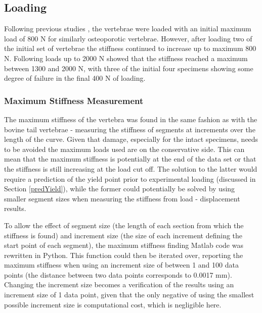 \subsection{Loading}

Following previous studies \cite{Wijayathunga2008}, the vertebrae were loaded
with an initial maximum load of 800 N for similarly osteoporotic vertebrae.
However, after loading two of the initial set of vertebrae the stiffness
continued to increase up to maximum 800 N. Following loads up to 2000 N showed
that the stiffness reached a maximum between 1300 and 2000 N, with three of the
initial four specimens showing some degree of failure in the final 400 N of
loading.

\subsubsection{Maximum Stiffness Measurement}

The maximum stiffness of the vertebra was found in the same fashion as with the
bovine tail vertebrae - measuring the stiffness of segments at increments over
the length of the curve. Given that damage, especially for the intact specimens,
needs to be avoided the maximum loads used are on the conservative side. This
can mean that the maximum stiffness is potentially at the end of the data set or
that the stiffness is still increasing at the load cut off. The solution to the
latter would require a prediction of the yield point prior to experimental
loading (discussed in Section \ref{predYield}), while the former could
potentially be solved by using smaller segment sizes when measuring the
stiffness from load - displacement results.

To allow the effect of segment size (the length of each section from which the
stiffness is found) and increment size (the size of each increment defining the
start point of each segment), the maximum stiffness finding Matlab code was
rewritten in Python. This function could then be iterated over, reporting the
maximum stiffness when using an increment size of between 1 and 100 data points
(the distance between two data points corresponds to 0.0017 mm). Changing the
increment size becomes a verification of the results using an increment size of
1 data point, given that the only negative of using the smallest possible
increment size is computational cost, which is negligible here.

